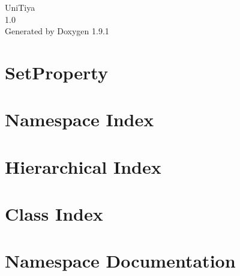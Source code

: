 \let\mypdfximage\pdfximage\def\pdfximage{\immediate\mypdfximage}\documentclass[twoside]{book}
\newcommand{\+}{\discretionary{\mbox{\scriptsize$\hookleftarrow$}}{}{}}
\newcommand{\clearemptydoublepage}{%
  \newpage{\pagestyle{empty}\cleardoublepage}%
}
\begin{document}
\raggedbottom

\hypersetup{pageanchor=false,
             bookmarksnumbered=true,
             pdfencoding=unicode
            }
\begin{titlepage}
\vspace*{7cm}
\begin{center}%
{\Large Uni\+Tiya \\[1ex]\large 1.\+0 }\\
\vspace*{1cm}
{\large Generated by Doxygen 1.9.1}\\
\end{center}
\end{titlepage}
\clearemptydoublepage
{}
\tableofcontents
\clearemptydoublepage
{}
\hypersetup{pageanchor=true}

\chapter{Set\+Property}
\label{md__runtime__tiya_property_attributes__set_property__r_e_a_d_m_e}

\chapter{Namespace Index}

\chapter{Hierarchical Index}

\chapter{Class Index}

\chapter{Namespace Documentation}


















\end{document}
